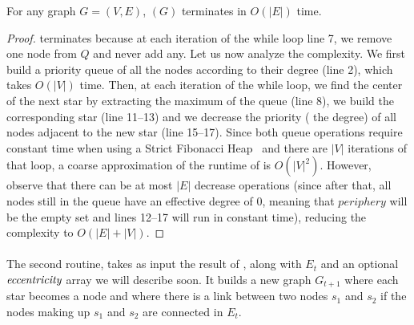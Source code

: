 \begin{prop}
  For any graph $G=(V,E)$, \extractStar$(G)$ terminates in $O(|E|)$ time.
\end{prop}
\begin{proof}
\extractStar{} terminates because at each iteration of the while loop line 7, we remove one node
from $Q$ and never add any. Let us now analyze the complexity. We first
build a priority queue of all the nodes according to their degree (line 2), which takes $O(|V|)$ time.
Then, at each iteration of the while loop, we find the center of the next star by extracting the
maximum of the queue (line 8), we build the corresponding star (line 11--13) and we decrease the
priority (\ie{} the degree) of all nodes adjacent to the new star (line 15--17).  Since both
queue operations require constant time when using a Strict Fibonacci Heap~\autocite{FibonacciHeaps12} and
there are $|V|$ iterations of that loop, a coarse approximation of the runtime of \extractStar{} is
$O(|V|^2)$. However, observe that there can be at most $|E|$ decrease operations (since after that, all
nodes still in the queue have an effective degree of $0$, meaning that $periphery$ will be the empty
set and lines 12--17 will run in constant time), reducing the complexity to $O(|E|+|V|)$.
\end{proof}

\paragraph{\collapseStar{}}\label{par:collapsestar}%
The second routine, \collapseStar{} takes as input the result of \extractStar{}, along with $E_t$
and an optional $\emph{eccentricity}$ array we will describe soon. It builds a new graph $G_{t+1}$
where each star becomes a node and where there is a link between two nodes $s_1$ and $s_2$ if the nodes
making up $s_1$ and $s_2$ are connected in $E_t$.

